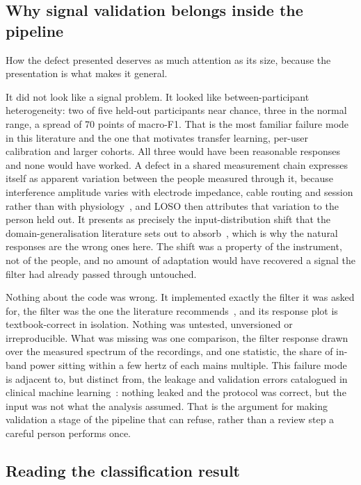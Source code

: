 \documentclass[pdflatex,sn-nature,iicol]{sn-jnl}
\begin{document}
\subsection{Why signal validation belongs inside the pipeline}

How the defect presented deserves as much attention as its size, because the presentation is what makes it general.

It did not look like a signal problem. It looked like between-participant heterogeneity: two of five held-out participants near chance, three in the normal range, a spread of 70 points of macro-F1. That is the most familiar failure mode in this literature and the one that motivates transfer learning, per-user calibration and larger cohorts. All three would have been reasonable responses and none would have worked. A defect in a shared measurement chain expresses itself as apparent variation between the people measured through it, because interference amplitude varies with electrode impedance, cable routing and session rather than with physiology~\cite{deluca2010filtering,besomi2019consensus}, and LOSO then attributes that variation to the person held out. It presents as precisely the input-distribution shift that the domain-generalisation literature sets out to absorb~\cite{wang2022generalizing,kouw2021review}, which is why the natural responses are the wrong ones here. The shift was a property of the instrument, not of the people, and no amount of adaptation would have recovered a signal the filter had already passed through untouched.

Nothing about the code was wrong. It implemented exactly the filter it was asked for, the filter was the one the literature recommends~\cite{chowdhury2013surface,raez2006techniques}, and its response plot is textbook-correct in isolation. Nothing was untested, unversioned or irreproducible. What was missing was one comparison, the filter response drawn over the measured spectrum of the recordings, and one statistic, the share of in-band power sitting within a few hertz of each mains multiple. This failure mode is adjacent to, but distinct from, the leakage and validation errors catalogued in clinical machine learning~\cite{saeb2017need,kapoor2023leakage,varoquaux2022machine}: nothing leaked and the protocol was correct, but the input was not what the analysis assumed. That is the argument for making validation a stage of the pipeline that can refuse, rather than a review step a careful person performs once.

\subsection{Reading the classification result}
\end{document}

